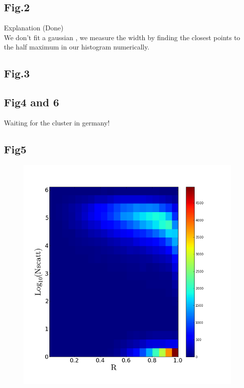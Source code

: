 \documentclass[12pt]{article}
\begin{document}
\subsection*{Fig.2}

Explanation (Done)\\
We don't fit a gaussian , we measure the width by finding
the closest points to the half maximum in our histogram numerically.

\subsection*{Fig.3}



\subsection*{Fig4 and 6}

Waiting for the cluster in germany!

\subsection*{Fig5}
\begin{figure}
\includegraphics[scale=0.4]{Histogram2dNscattVSRadius.png}
\end{figure}
\end{document}
